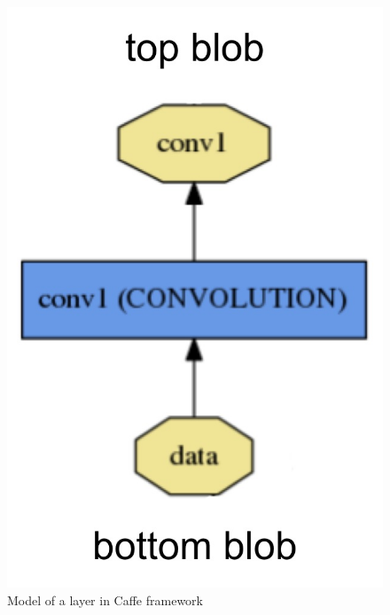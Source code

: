 \begin{multicols}{2}
\begin{figure}
	\includegraphics[scale=0.45]{images/caffelayer}
	\caption{Model of a layer in Caffe framework}
	\label{figcaffelayer}
\end{figure}
\end{multicols}
